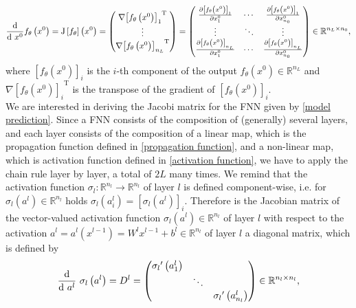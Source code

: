 \begin{equation*}
    \frac{\textup{d}}{\textup{d} \ x^0} f_{\theta}\left(x^0\right) = \mathrm{J} \left[f_{\theta} \right]\left(x^0\right) = \begin{pmatrix} \nabla {\left[f_{\theta}\left(x^0\right)\right]_{1}}^{\mathrm{T}} \\ \vdots \\  \nabla {\left[f_{\theta}\left(x^0\right)\right]_{n_L}}^{\mathrm{T}} \end{pmatrix} = \begin{pmatrix} \frac{\partial \left[f_{\theta}\left(x^0\right)\right]_1}{\partial x^0_{1}} & \cdots & \frac{\partial \left[f_{\theta}\left(x^0\right)\right]_1}{\partial x^0_{n_0}} \\ \vdots & \ddots & \vdots \\ \frac{\partial \left[f_{\theta}\left(x^0\right)\right]_{n_L}}{\partial x^0_{1}} & \cdots & \frac{\partial \left[f_{\theta}\left(x^0\right)\right]_{n_L}}{\partial x^0_{n_0}} \end{pmatrix} \in \mathbb{R}^{n_L \times n_0}, 
\end{equation*}
where $\left[f_{\theta}\left(x^0\right)\right]_i$ is the $i$-th component of the output $f_{\theta}\left(x^0\right) \in \mathbb{R}^{n_L}$ and $\nabla {\left[f_{\theta}\left(x^0\right)\right]_i}^{\mathrm{T}}$ is the transpose of the gradient of $\left[f_{\theta}\left(x^0\right)\right]_i$. \\
We are interested in deriving the Jacobi matrix for the FNN given by \cref{model prediction}. Since a FNN consists of the composition of (generally) several layers, and each layer consists of the composition of a linear map, which is the propagation function defined in \cref{propagation function}, and a non-linear map, which is activation function defined in \cref{activation function}, we have to apply the chain rule layer by layer, a total of $2L$ many times. We remind that the activation function $\sigma_{l} \colon \mathbb{R}^{n_l} \to \mathbb{R}^{n_l}$ of layer $l$ is defined component-wise, i.e. for $\sigma_{l}\left(a^l\right) \in \mathbb{R}^{n_l}$ holds $\sigma_{l}\left(a^l_i\right) = \left[ \sigma_{l}\left(a^l\right) \right]_i$. Therefore is the Jacobian matrix of the vector-valued activation function $\sigma_{l}\left(a^l\right) \in \mathbb{R}^{n_l}$ of layer $l$ with respect to the activation $a^l = a^l\left(x^{l-1}\right) = W^{l} x^{l-1} + b^{l} \in \mathbb{R}^{n_l}$ of layer $l$ a diagonal matrix, which is defined by
\begin{equation}
    \label{derivative:activation:function}
    \frac{\textup{d}}{\textup{d} \ a^{l}} \ \sigma_{l} \left(a^l\right) = D^{l} = \begin{pmatrix} {\sigma_{l}}^{\prime} \left( a^{l}_1 \right) & & \\ & \ddots & \\ & & {\sigma_{l}}^{\prime} \left( a^{l}_{n_l} \right) \end{pmatrix} \in \mathbb{R}^{n_l \times n_l}, 
\end{equation}
